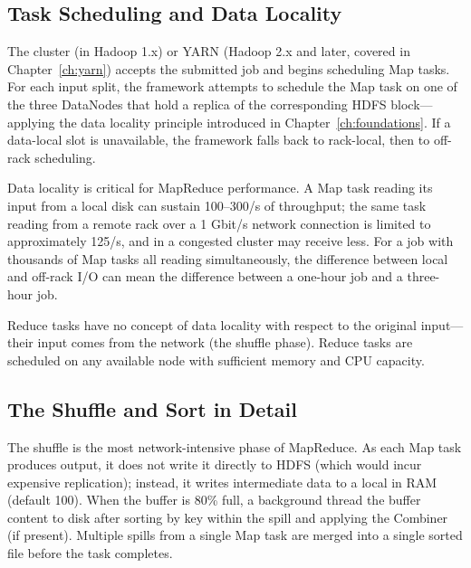 \subsection{Task Scheduling and Data Locality}
\label{subsec:scheduling}

The cluster  (in Hadoop 1.x) or YARN
 (Hadoop 2.x and later, covered in
Chapter~\ref{ch:yarn}) accepts the submitted job and begins scheduling
Map tasks. For each input split, the framework attempts to schedule the
Map task on one of the three DataNodes that hold a replica of the
corresponding HDFS block---applying the data locality principle
introduced in Chapter~\ref{ch:foundations}. If a data-local slot is
unavailable, the framework falls back to rack-local, then to
off-rack scheduling.

Data locality is critical for MapReduce performance. A Map task reading
its input from a local disk can sustain 100--300\MB/s of throughput;
the same task reading from a remote rack over a 1 Gbit/s network
connection is limited to approximately 125\MB/s, and in a congested
cluster may receive less. For a job with thousands of Map tasks all
reading simultaneously, the difference between local and off-rack
I/O can mean the difference between a one-hour job and a three-hour
job.

Reduce tasks have no concept of data locality with respect to the
original input---their input comes from the network (the shuffle
phase). Reduce tasks are scheduled on any available node with
sufficient memory and CPU capacity.

\subsection{The Shuffle and Sort in Detail}
\label{subsec:shuffle-sort}

The shuffle is the most network-intensive phase of MapReduce. As each
Map task produces output, it does not write it directly to HDFS
(which would incur expensive replication); instead, it writes
intermediate data to a local  in RAM (default
100\MB). When the buffer is 80\% full, a background thread
 the buffer content to disk after sorting by key within
the spill and applying the Combiner (if present). Multiple spills
from a single Map task are merged into a single sorted file before the
task completes.

